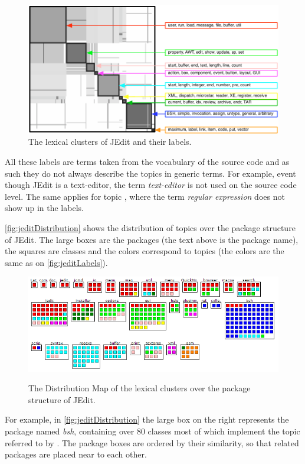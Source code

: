 \begin{figure}[h]
\centering
\includegraphics[width=0.8\columnwidth]{fig/hapax-jedit-correlation-labels}
\caption{The lexical clusters of JEdit and their labels.}\label{fig:jeditLabels}
\end{figure}

All these labels are terms taken from the vocabulary of the source code and as such they do not always describe the topics in generic terms. For example, event though JEdit is a text-editor, the term \emph{text-editor} is not used on the source code level. The same applies for topic \cyan, where the term \emph{regular expression} does not show up in the labels.

\autoref{fig:jeditDistribution} shows the distribution of topics over the package structure of JEdit. The large boxes are the packages (the text above is the package name), the squares are classes and the colors correspond to topics (the colors are the same as on \autoref{fig:jeditLabels}).

\begin{figure}[h]
  \centering
  \includegraphics[width=\linewidth]{fig/hapax-jedit-distribution}\\
  \caption{The Distribution Map of the lexical clusters over the package structure of JEdit.}\label{fig:jeditDistribution}
\end{figure}


For example, in \autoref{fig:jeditDistribution} the large box on the right represents the package named \emph{bsh}, containing over 80 classes most of which implement the topic referred to by \blue. The package boxes are ordered by their similarity, so that related packages are placed near to each other.

